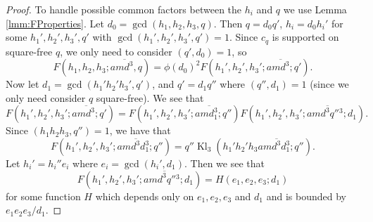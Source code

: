 \documentclass[10pt]{amsart}
\theoremstyle{plain}
\numberwithin{equation}{section}
\DeclareMathOperator{\Kl}{Kl}
\begin{document}
\begin{proof}
To handle possible common factors between the $h_i$ and $q$ we use Lemma \ref{lmm:FProperties}. Let $d_0=\gcd(h_1,h_2,h_3,q)$. Then $q=d_0q'$, $h_i=d_0h_i'$ for some $h_1',h_2',h_3',q'$ with $\gcd(h_1',h_2',h_3',q')=1$. Since $c_q$ is supported on square-free $q$, we only need to consider $(q',d_0)=1$, so
\[
F(h_1,h_2,h_3;a\overline{m d^3},q)=\phi(d_0)^2 F(h_1',h_2',h_3';a\overline{m d^3};q').
\]
Now let $d_1=\gcd(h_1'h_2'h_3',q')$, and $q'=d_1 q''$ where $(q'',d_1)=1$ (since we only need consider $q$ square-free). We see that
\[
F(h_1',h_2',h_3';a\overline{m d^3};q')=F(h_1',h_2',h_3';a\overline{m d_1^3};q'')F(h_1',h_2',h_3';a\overline{m d^3 q''{}^3};d_1).
\]
Since $(h_1h_2h_3,q'')=1$, we have that
\[
F(h_1',h_2',h_3';a\overline{m d^3 d_1^3};q'')=q''\Kl_3(h_1'h_2'h_3a\overline{m d^3 d_1^3};q'').
\]
Let $h_i'=h_i''e_i$ where $e_i=\gcd(h_i',d_1)$. Then we see that 
\[
F(h_1',h_2',h_3';a\overline{m d^3 q''{}^3};d_1)=H(e_1,e_2,e_3;d_1)
\]
for some function $H$ which depends only on $e_1,e_2,e_3$ and $d_1$ and is bounded by $e_1e_2e_3/d_1$.


\end{proof}
\end{document}
